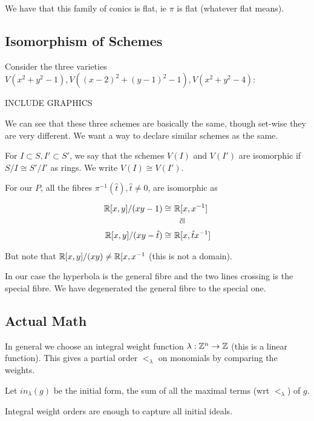 We have that this family of conics is flat, ie $\pi$ is flat (whatever flat means).

\subsection{Isomorphism of Schemes}

Consider the three varieties $V(x^2 + y^2 - 1), V((x-2)^2 + (y-1)^2 - 1),V(x^2 + y^2 - 4)$:

INCLUDE GRAPHICS

We can see that these three schemes are basically the same, though set-wise they are very different. We want a way to declare similar schemes as the same.

\begin{definition}
For $I \subset S, I' \subset S'$, we say that the schemes $V(I)$ and $V(I') $ are isomorphic if $S / I \cong S'/I'$ as rings. We write $V(I) \cong V(I')$.  
\end{definition}

For our $P$, all the fibres $\pi^{-1} (\hat{t}), \hat{t} \neq 0 $, are isomorphic as

\begin{align*}
    \R [ x,y] / (xy - 1) \cong \,\, &\R [x,x^{-1}]\\
    & \,\,\,\, \rotatebox{90}{$\cong$}\\
    \R [ x,y] / (xy - \hat{t}) \cong \,\,  &\R [x,\hat{t} x^{-1}]
\end{align*}

But note that $\mathbb{R}[x,y] / (xy) \neq \mathbb{R}[x,x^{-1}$ (this is not a domain).

In our case the hyperbola is the general fibre and the two lines crossing is the special fibre. We have degenerated the general fibre to the special one.

\subsection{Actual Math}

In general we choose an integral weight function $\lambda : \mathbb{Z}^n  \to \mathbb{Z}$ (this is a linear function). This gives a partial order $<_\lambda$ on monomials by comparing the weights.

Let $in_\lambda(g) $ be the initial form, the sum of all the maximal terms (wrt $<_\lambda$) of $g$.

Integral weight orders are enough to capture all initial ideals.

